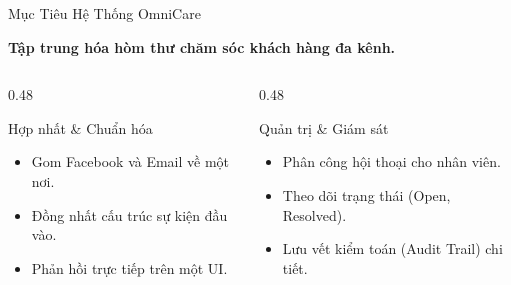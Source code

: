 \documentclass[aspectratio=169, 10pt]{beamer}
\begin{document}
\begin{frame}{Mục Tiêu Hệ Thống OmniCare}
    \begin{center}
        \large\textbf{\color{accent}Tập trung hóa hòm thư chăm sóc khách hàng đa kênh.}
    \end{center}
    \vspace{0.4cm}
    \begin{columns}[T]
        \begin{column}{0.48\textwidth}
            \begin{block}{Hợp nhất \& Chuẩn hóa}
                \begin{itemize}
                    \item Gom Facebook và Email về một nơi.
                    \item Đồng nhất cấu trúc sự kiện đầu vào.
                    \item Phản hồi trực tiếp trên một UI.
                \end{itemize}
            \end{block}
        \end{column}
        
        \begin{column}{0.48\textwidth}
            \begin{block}{Quản trị \& Giám sát}
                \begin{itemize}
                    \item Phân công hội thoại cho nhân viên.
                    \item Theo dõi trạng thái (Open, Resolved).
                    \item Lưu vết kiểm toán (Audit Trail) chi tiết.
                \end{itemize}
            \end{block}
        \end{column}
    \end{columns}
\end{frame}
\end{document}

